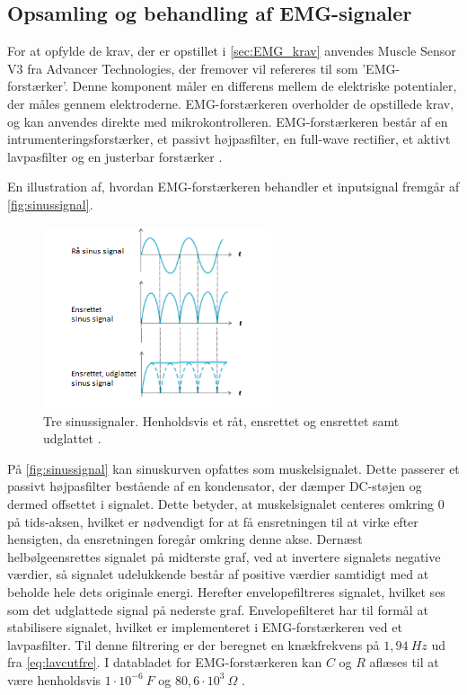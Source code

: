 \subsection{Opsamling og behandling af EMG-signaler} \label{sec:EMG_imp}
For at opfylde de krav, der er opstillet i \autoref{sec:EMG_krav} anvendes Muscle Sensor V3 fra Advancer Technologies, der fremover vil refereres til som 'EMG-forstærker'. Denne komponent måler en differens mellem de elektriske potentialer, der måles gennem elektroderne. EMG-forstærkeren overholder de opstillede krav, og kan anvendes direkte med mikrokontrolleren. EMG-forstærkeren består af en intrumenteringsforstærker, et passivt højpasfilter, en full-wave rectifier, et aktivt lavpasfilter og en justerbar forstærker \citep{advancertech2013}. 

En illustration af, hvordan EMG-forstærkeren behandler et inputsignal fremgår af \autoref{fig:sinussignal}.
\begin{figure}[H]
\centering
\includegraphics[width=0.6\textwidth]{figures/sinussignal.png}
\caption{Tre sinussignaler. Henholdsvis et råt, ensrettet og ensrettet samt udglattet \citep{advancertech2013}.}
\label{fig:sinussignal}
\end{figure}

\noindent
På \autoref{fig:sinussignal} kan sinuskurven opfattes som muskelsignalet. Dette passerer et passivt højpasfilter bestående af en kondensator, der dæmper DC-støjen og dermed offsettet i signalet. Dette betyder, at muskelsignalet centeres omkring 0 på tids-aksen, hvilket er nødvendigt for at få ensretningen til at virke efter hensigten, da ensretningen foregår omkring denne akse. Dernæst helbølgeensrettes signalet på midterste graf, ved at invertere signalets negative værdier, så signalet udelukkende består af positive værdier samtidigt med at beholde hele dets originale energi. Herefter envelopefiltreres signalet, hvilket ses som det udglattede signal på nederste graf. Envelopefilteret har til formål at stabilisere signalet, hvilket er implementeret i EMG-forstærkeren ved et lavpasfilter. Til denne filtrering er der beregnet en knækfrekvens på $1,94~Hz$ ud fra \autoref{eq:lavcutfre}. I databladet for EMG-forstærkeren kan $C$ og $R$ aflæses til at være henholdsvis $1 \cdot 10^{-6}~F$ og $80,6 \cdot 10^3~\Omega$ \citep{advancertech2013}. 

